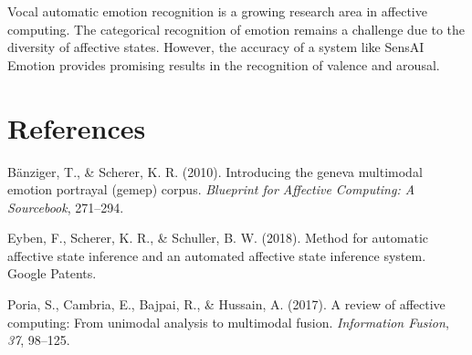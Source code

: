 \documentclass[]{elsarticle} %
\begin{document}
Vocal automatic emotion recognition is a growing research area in
affective computing. The categorical recognition of emotion remains a
challenge due to the diversity of affective states. However, the
accuracy of a system like SensAI Emotion provides promising results in
the recognition of valence and arousal.

\section*{References}\label{references}

\hypertarget{refs}{}
\hypertarget{ref-banziger2010introducing}{}
Bänziger, T., \& Scherer, K. R. (2010). Introducing the geneva
multimodal emotion portrayal (gemep) corpus. \emph{Blueprint for
Affective Computing: A Sourcebook}, 271--294.

\hypertarget{ref-eyben2018method}{}
Eyben, F., Scherer, K. R., \& Schuller, B. W. (2018). Method for
automatic affective state inference and an automated affective state
inference system. Google Patents.

\hypertarget{ref-poria2017review}{}
Poria, S., Cambria, E., Bajpai, R., \& Hussain, A. (2017). A review of
affective computing: From unimodal analysis to multimodal fusion.
\emph{Information Fusion}, \emph{37}, 98--125.
\end{document}
